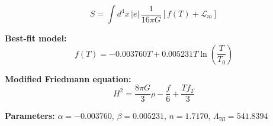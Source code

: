 
\begin{equation}
  S = \int d^4x \, |e| \, \frac{1}{16\pi G} \left[ f(T) + \mathcal{L}_m \right]
\end{equation}

\textbf{Best-fit model:}
\begin{equation}
  f(T) = -0.003760 T + 0.005231 T \ln\!\left(\frac{T}{T_0}\right)
\end{equation}

\textbf{Modified Friedmann equation:}
\begin{equation}
  H^2 = \frac{8\pi G}{3} \rho - \frac{f}{6} + \frac{T f_T}{3}
\end{equation}

\textbf{Parameters:}
$\alpha = -0.003760$, \quad
$\beta = 0.005231$, \quad
$n = 1.7170$, \quad
$\Lambda_{\text{BI}} = 541.8394$